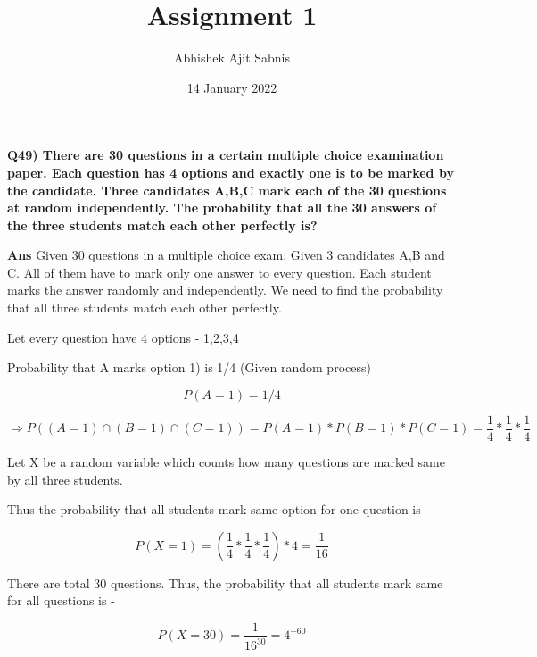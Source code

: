 \documentclass{article}
\title{\textbf{Assignment 1}}
\author{Abhishek Ajit Sabnis}
\date{14 January 2022}
\begin{document}
\maketitle

\textbf{Q49) There are 30 questions in a certain multiple choice examination paper. Each question has 4 options and exactly one is to be marked by the candidate. Three candidates A,B,C mark each of the 30 questions at random independently. The probability that all the 30 answers of the three students match each other perfectly is?}

\vspace{1cm}

\textbf{Ans}  Given 30 questions in a multiple choice exam. Given 3 candidates A,B and C. All of them have to mark only one answer to every question. Each student marks the answer randomly and independently. We need to find the probability that all three students match each other perfectly.

Let every question have 4 options - 1,2,3,4
\vspace{0.5cm}

Probability that A marks option 1) is 1/4 (Given random process)

\begin{equation}
    P(A=1) = 1/4
\end{equation}

\begin{equation}
    \Rightarrow P((A=1) \cap (B=1) \cap (C=1)) = P(A=1) * P(B=1) * P(C=1)  
 = \frac{1}{4} * \frac{1}{4} * \frac{1}{4}
\end{equation}

Let X be a random variable which counts how many questions are marked same by all three students. 

Thus the probability that all students mark same option for one question is
\vspace{0.5cm}

 
\begin{equation}
    P(X=1) = (\frac{1}{4} * \frac{1}{4} * \frac{1}{4}) *4 = \frac{1}{16}
\end{equation}

There are total 30 questions. Thus, the probability that all students mark same for all questions is - 

\begin{equation}
     P(X=30) = \frac{1}{16^{30}} = 4^{-60}
\end{equation}
\end{document}
